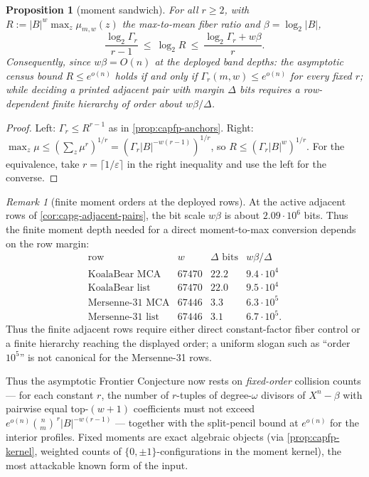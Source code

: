 \documentclass[11pt]{article}
\newtheorem{proposition}[proposition]{Proposition}
\theoremstyle{definition}
\theoremstyle{remark}
\newtheorem{remark}[remark]{Remark}
\newcommand{\B}{B}
\begin{document}
\begin{proposition}[moment sandwich]\label{prop:capfp-Q-sandwich}
For all $r\ge2$, with $R:=|\B|^w\max_z\mu_{m,w}(z)$ the max-to-mean fiber ratio and $\beta=\log_2|\B|$,
\[
        \frac{\log_2\Gamma_r}{\,r-1\,}\ \le\ \log_2R\ \le\ \frac{\log_2\Gamma_r+w\beta}{r}.
\]
Consequently, since $w\beta=O(n)$ at the deployed band depths: the asymptotic census bound $R\le e^{o(n)}$ holds \emph{if and only if} $\Gamma_r(m,w)\le e^{o(n)}$ for every fixed $r$; while deciding a printed adjacent pair with margin $\Delta$ bits requires a row-dependent finite hierarchy of order about $w\beta/\Delta$.
\end{proposition}

\begin{proof}
Left: $\Gamma_r\le R^{r-1}$ as in \cref{prop:capfp-anchors}.  Right: $\max_z\mu\le(\sum_z\mu^r)^{1/r}=(\Gamma_r|\B|^{-w(r-1)})^{1/r}$, so $R\le(\Gamma_r|\B|^{w})^{1/r}$.  For the equivalence, take $r=\lceil1/\varepsilon\rceil$ in the right inequality and use the left for the converse.
\end{proof}

\begin{remark}[finite moment orders at the deployed rows]\label{rem:capfp-finite-orders}
At the active adjacent rows of \cref{cor:capg-adjacent-pairs}, the bit scale
$w\beta$ is about $2.09\cdot10^6$ bits.  Thus the finite moment depth needed
for a direct moment-to-max conversion depends on the row margin:
\[
\begin{array}{c|c|c|c}
\text{row} & w & \Delta\text{ bits} & w\beta/\Delta \\
\hline
\text{KoalaBear MCA} & 67470 & 22.2 & 9.4\cdot10^4 \\
\text{KoalaBear list} & 67470 & 22.0 & 9.5\cdot10^4 \\
\text{Mersenne-31 MCA} & 67446 & 3.3 & 6.3\cdot10^5 \\
\text{Mersenne-31 list} & 67446 & 3.1 & 6.7\cdot10^5 .
\end{array}
\]
Thus the finite adjacent rows require either direct constant-factor fiber
control or a finite hierarchy reaching the displayed order; a uniform slogan
such as ``order $10^5$'' is not canonical for the Mersenne-31 rows.
\end{remark}

Thus the asymptotic Frontier Conjecture now rests on \emph{fixed-order} collision counts --- for each constant $r$, the number of $r$-tuples of degree-$\omega$ divisors of $X^n-\beta$ with pairwise equal top-$(w{+}1)$ coefficients must not exceed $e^{o(n)}\binom nm^{\,r}|\B|^{-w(r-1)}$ --- together with the split-pencil bound at $e^{o(n)}$ for the interior profiles.  Fixed moments are exact algebraic objects \textup(via \cref{prop:capfp-kernel}, weighted counts of $\{0,\pm1\}$-configurations in the moment kernel\textup), the most attackable known form of the input.
\end{document}
